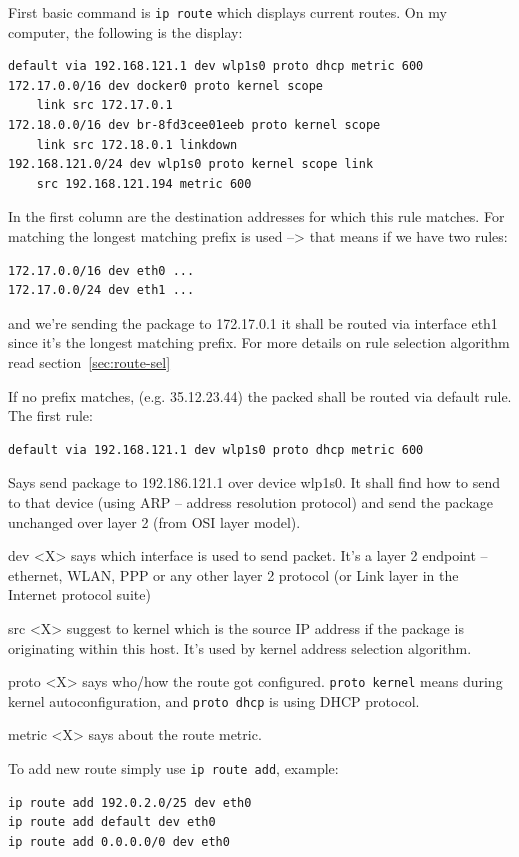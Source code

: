 \documentclass[times, utf8, seminar, english]{fer}
\begin{document}
First basic command is \verb|ip route| which displays current routes. On my computer, the following is the display:
\begin{verbatim}
default via 192.168.121.1 dev wlp1s0 proto dhcp metric 600
172.17.0.0/16 dev docker0 proto kernel scope
    link src 172.17.0.1
172.18.0.0/16 dev br-8fd3cee01eeb proto kernel scope
    link src 172.18.0.1 linkdown
192.168.121.0/24 dev wlp1s0 proto kernel scope link
    src 192.168.121.194 metric 600
\end{verbatim}
In the first column are the destination addresses for which this rule matches. For matching the longest matching prefix is used --> that means if we have two rules:
\begin{verbatim}
172.17.0.0/16 dev eth0 ...
172.17.0.0/24 dev eth1 ...
\end{verbatim}
and we're sending the package to 172.17.0.1 it shall be routed via interface eth1 since it's the longest matching prefix. For more details on rule selection algorithm read section~\ref{sec:route-sel}

If no prefix matches, (e.g. 35.12.23.44) the packed shall be routed via default rule. The first rule:

\begin{verbatim}
default via 192.168.121.1 dev wlp1s0 proto dhcp metric 600
\end{verbatim}

Says send package to 192.186.121.1 over device wlp1s0. It shall find how to send to that device (using ARP -- address resolution protocol) and send the package unchanged over layer 2 (from OSI layer model).

dev <X> says which interface is used to send packet. It's a layer 2 endpoint -- ethernet, WLAN, PPP or any other layer 2 protocol (or Link layer in the Internet protocol suite)

src <X> suggest to kernel which is the source IP address if the package is originating within this host. It's used by kernel address selection algorithm.

proto <X> says who/how the route got configured. \verb|proto kernel| means during kernel autoconfiguration, and \verb|proto dhcp| is using DHCP protocol.

metric <X> says about the route metric.

To add new route simply use \verb|ip route add|, example:
\begin{verbatim}
ip route add 192.0.2.0/25 dev eth0
ip route add default dev eth0
ip route add 0.0.0.0/0 dev eth0
\end{verbatim}
\end{document}

